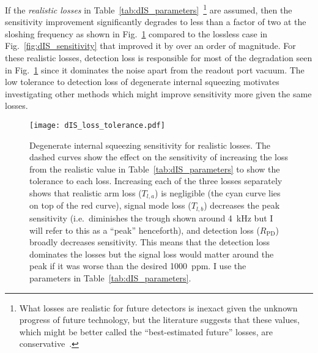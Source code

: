 If the \emph{realistic losses} in Table~\ref{tab:dIS_parameters}~\footnote{What losses are realistic for future detectors is inexact given the unknown progress of future technology, but the literature suggests that these values, which might be better called the ``best-estimated future'' losses, are conservative~\cite{zhangBroadbandSignalRecycling2021,flaminio2010study}.} are assumed, then the sensitivity improvement significantly degrades to less than a factor of two at the sloshing frequency as shown in Fig.~\ref{fig:dIS_loss_tolerance} compared to the lossless case in Fig.~\ref{fig:dIS_sensitivity} that improved it by over an order of magnitude. For these realistic losses, detection loss is responsible for most of the degradation seen in Fig.~\ref{fig:dIS_loss_tolerance} since it dominates the noise apart from the readout port vacuum. %
The low tolerance to detection loss of degenerate internal squeezing motivates investigating other methods which might improve sensitivity more given the same losses. 

\begin{figure}[t]
	\centering
	\texttt{[image: dIS\_loss\_tolerance.pdf]}
	\caption{Degenerate internal squeezing sensitivity for realistic losses. The dashed curves show the effect on the sensitivity of increasing the loss from the realistic value in Table~\ref{tab:dIS_parameters} to show the tolerance to each loss. Increasing each of the three losses separately shows that realistic arm loss ($T_{l,a}$) is negligible (the cyan curve lies on top of the red curve), signal mode loss ($T_{l,b}$) decreases the peak sensitivity (i.e.\ diminishes the trough shown around 4~kHz but I will refer to this as a ``peak'' henceforth), and detection loss ($R_\text{PD}$) broadly decreases sensitivity. This means that the detection loss dominates the losses but the signal loss would matter around the peak if it was worse than the desired 1000~ppm. I use the parameters in Table~\ref{tab:dIS_parameters}.}
	\label{fig:dIS_loss_tolerance}
\end{figure}


